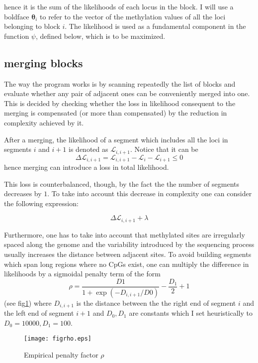 \documentclass[12pt]{amsart}
\newcommand{\lik}{\ensuremath{\mathcal{L}}}
\begin{document}
hence it is the sum of the likelihoods of each locus in the block. I will use a boldface
$\pmb{\theta}_i$ to refer to the vector of the methylation values of all the loci belonging to 
block $i$.  The likelihood is used as a fundamental component in the function $\psi$, defined below,
which is to be maximized.

\subsection{merging blocks}

The way the program works is by 
scanning repeatedly the list of blocks and evaluate whether any pair 
of adjacent ones can be conveniently merged into one.  
This is decided by checking whether the loss in 
likelihood consequent to the merging is compensated 
(or more than compensated)
by the reduction in complexity achieved by it.



After a merging, the likelihood of a segment which includes
all the loci in segments $i$ and $i+1$ is denoted as $\mathcal{L}_{i,i+1}$.
Notice that it can be  
\[\Delta  \lik_{i,i+1} = \mathcal{L}_{i,i+1} - \mathcal{L}_i - \mathcal{L}_{i+1} \leq 0\] 
hence merging  can introduce a loss in total likelihood. 

This loss is counterbalanced, though, by the fact the the number 
of segments decreases by $1$. To take into account this decrease in 
complexity one can consider the following expression:

\[\Delta  \lik_{i,i+1}  + \lambda\]

Furthermore, one has to take into account that methylated sites are irregularly 
spaced along the genome and the variability 
introduced by the sequencing process usually increases the distance 
between adjacent sites.
To avoid building segments which span long regions where no CpGs exist, one 
can multiply the difference in likelihoods by a sigmoidal penalty term of the
form \[\rho=\frac{D1}{1+\exp(-D_{i,i+1}/D0)}-\frac{D_1}{2}+1\] (see fig\ref{figrho}) 
where $D_{i,i+1}$ is the distance 
between the the right end of segment $i$ and the left end of segment $i+1$ and 
$D_0,D_1$ are constants which  I set heuristically to  $D_0=10000,D_1=100$. 

\begin{figure}\label{figrho}
\texttt{[image: figrho.eps]}
\caption{Empirical penalty factor $\rho$}
\end{figure}
\end{document}
